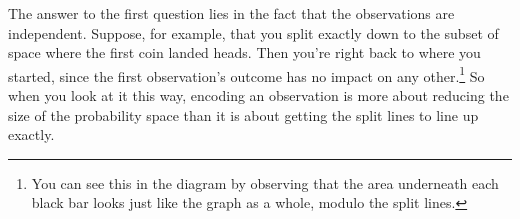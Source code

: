 \documentclass{article}
\begin{document}
    The answer to the first question lies in the fact that the observations are
    independent. Suppose, for example, that you split exactly down to the
    subset of space where the first coin landed heads. Then you're right back
    to where you started, since the first observation's outcome has no impact
    on any other.\footnote{You can see this in the diagram by observing that
    the area underneath each black bar looks just like the graph as a whole,
    modulo the split lines.} So when you look at it this way, encoding an
    observation is more about reducing the size of the probability space than
    it is about getting the split lines to line up exactly.
\end{document}
